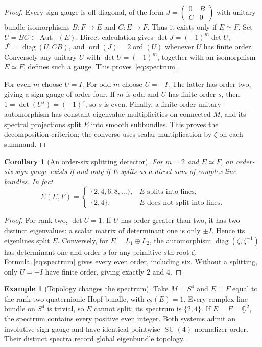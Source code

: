 \documentclass[11pt]{amsart}
\newcommand{\ord}{\operatorname{ord}}
\newcommand{\SU}{\operatorname{SU}}
\newcommand{\U}{\operatorname{U}}
\newcommand{\C}{\mathbb C}
\theoremstyle{plain}
\newtheorem{corollary}[theorem]{Corollary}
\theoremstyle{definition}
\newtheorem{example}[theorem]{Example}
\theoremstyle{remark}
\begin{document}
\begin{proof}
Every sign gauge is off diagonal, of the form $J=\left(\begin{smallmatrix}0&B\\ C&0\end{smallmatrix}\right)$ with unitary bundle isomorphisms $B:F\to E$ and $C:E\to F$. Thus it exists only if $E\simeq F$. Set $U=BC\in\operatorname{Aut}_{\U}(E)$. Direct calculation gives $\det J=(-1)^m\det U$, $J^2=\operatorname{diag}(U,CB)$, and $\ord(J)=2\ord(U)$ whenever $U$ has finite order. Conversely any unitary $U$ with $\det U=(-1)^m$, together with an isomorphism $E\simeq F$, defines such a gauge. This proves~\eqref{eq:spectrum}.

For even $m$ choose $U=I$. For odd $m$ choose $U=-I$. The latter has order two, giving a sign gauge of order four. If $m$ is odd and $U$ has finite order $s$, then $1=\det(U^s)=(-1)^s$, so $s$ is even. Finally, a finite-order unitary automorphism has constant eigenvalue multiplicities on connected $M$, and its spectral projections split $E$ into smooth subbundles. This proves the decomposition criterion; the converse uses scalar multiplication by $\zeta$ on each summand.
\end{proof}

\begin{corollary}[An order-six splitting detector]\label{cor:six}
For $m=2$ and $E\simeq F$, an order-six sign gauge exists if and only if $E$ splits as a direct sum of complex line bundles. In fact
\[
 \Sigma(E,F)=
 \begin{cases}
 \{2,4,6,8,\ldots\},&E\text{ splits into lines},\\
 \{2,4\},&E\text{ does not split into lines}.
 \end{cases}
\]
\end{corollary}

\begin{proof}
For rank two, $\det U=1$. If $U$ has order greater than two, it has two distinct eigenvalues: a scalar matrix of determinant one is only $\pm I$. Hence its eigenlines split $E$. Conversely, for $E=L_1\oplus L_2$, the automorphism $\operatorname{diag}(\zeta,\zeta^{-1})$ has determinant one and order $s$ for any primitive $s$th root $\zeta$. Formula~\eqref{eq:spectrum} gives every even order, including six. Without a splitting, only $U=\pm I$ have finite order, giving exactly $2$ and $4$.
\end{proof}

\begin{example}[Topology changes the spectrum]
Take $M=S^4$ and $E=F$ equal to the rank-two quaternionic Hopf bundle, with $c_2(E)=1$. Every complex line bundle on $S^4$ is trivial, so $E$ cannot split; its spectrum is $\{2,4\}$. If $E=F=\underline{\C}^2$, the spectrum contains every positive even integer. Both systems admit an involutive sign gauge and have identical pointwise $\SU(4)$ normalizer order. Their distinct spectra record global eigenbundle topology.
\end{example}
\end{document}
